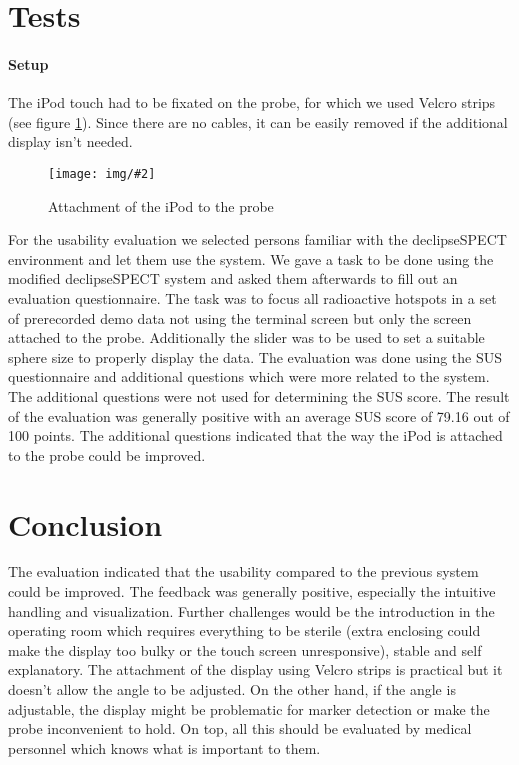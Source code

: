 \documentclass{scrartcl}
\newcommand{\graphic}[3][width=\linewidth] %
{
  \begin{figure}[h!t]
    \centering
    \texttt{[image: img/\#2]}
    \caption{#3}
    \label{fig:#2}
  \end{figure}
}
\newcommand{\refFigure}[1]{figure \ref{fig:#1}}
\begin{document}
\section{Tests}
\paragraph*{Setup}
The iPod touch had to be fixated on the probe, for which we used Velcro strips (see \refFigure{probe}). Since there are no cables, it can be easily removed if the additional display isn't needed.
\graphic[scale=.5]{probe}{Attachment of the iPod to the probe}

For the usability evaluation we selected persons familiar with the declipseSPECT environment and let them use the system. We gave a task to be done using the modified declipseSPECT system and asked them afterwards to fill out an evaluation questionnaire.
The task was to focus all radioactive hotspots in a set of prerecorded demo data not using the terminal screen but only the screen attached to the probe. Additionally the slider was to be used to set a suitable sphere size to properly display the data. The evaluation was done using the SUS \cite{sus} questionnaire and additional questions which were more related to the system. The additional questions were not used for determining the SUS score.
The result of the evaluation was generally positive with an average SUS score of 79.16 out of 100 points. The additional questions indicated that the way the iPod is attached to the probe could be improved.



\section{Conclusion}
The evaluation indicated that the usability compared to the previous system could be improved. The feedback was generally positive, especially the intuitive handling and visualization.
Further challenges would be the introduction in the operating room which requires everything to be sterile (extra enclosing could make the display too bulky or the touch screen unresponsive), stable and self explanatory.
The attachment of the display using Velcro strips is practical but it doesn't allow the angle to be adjusted. On the other hand, if the angle is adjustable, the display might be problematic for marker detection or make the probe inconvenient to hold.
On top, all this should be evaluated by medical personnel which knows what is important to them.




\end{document}
